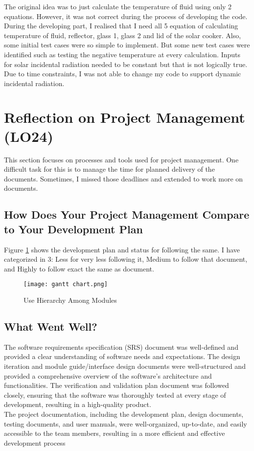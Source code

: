 \documentclass{article}
\begin{document}
The original idea was to just calculate the temperature of fluid using only 2 equations. However, it was not correct during the process of developing the code. During the developing part, I realised that I need all 5 equation of calculating temperature of fluid, reflector, glass 1, glass 2 and lid of the solar cooker. Also, some initial test cases were so simple to implement. But some new test cases were identified such as testing the negative temperature at every calculation. Inputs for solar incidental radiation needed to be constant but that is not logically true. Due to time constraints, I was not able to change my code to support dynamic incidental radiation.   

\section{Reflection on Project Management (LO24)}

This section focuses on processes and tools used for project management. One difficult task for this is to manage the time for planned delivery of the documents. Sometimes, I missed those deadlines and extended to work more on documents. 

\subsection{How Does Your Project Management Compare to Your Development Plan}

Figure \ref{FigUH} shows the development plan and status for following the same. I have categorized in 3: Less for very less following it, Medium to follow that document, and Highly to follow exact the same as document.

\begin{figure}[h!]
\begin{center}
\texttt{[image: gantt chart.png]}
\caption{Use Hierarchy Among Modules}
\label{FigUH}
\end{center}
\end{figure}

\subsection{What Went Well?}

The software requirements specification (SRS) document was well-defined and provided a clear understanding of software needs and expectations. The design iteration and module guide/interface design documents were well-structured and provided a comprehensive overview of the software's architecture and functionalities. The verification and validation plan document was followed closely, ensuring that the software was thoroughly tested at every stage of development, resulting in a high-quality product. \\ 
The project documentation, including the development plan, design documents, testing documents, and user manuals, were well-organized, up-to-date, and easily accessible to the team members, resulting in a more efficient and effective development process
\end{document}
